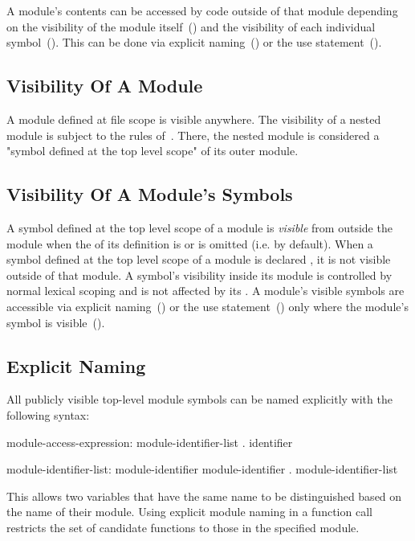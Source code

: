 A module's contents can be accessed by code outside of that module
depending on the visibility of the module
itself~() and the visibility of each
individual symbol~().  This can be done
via explicit naming~() or the use
statement~().

\subsection{Visibility Of A Module}
\label{Visibility_Of_A_Module}

A module defined at file scope is visible anywhere. The visibility of a nested
module is subject to the rules of~. There,
the nested module is considered a "symbol defined at the top level
scope" of its outer module.

\subsection{Visibility Of A Module's Symbols}
\label{Visibility_Of_Symbols}

A symbol defined at the top level scope of a module is \emph{visible}
from outside the module when the  of its
definition is  or is omitted (i.e. by default). When a
symbol defined at the top level scope of a module is declared
, it is not visible outside of that module. A
symbol's visibility inside its module is controlled by normal lexical
scoping and is not affected by its .  A
module's visible symbols are accessible via explicit
naming~() or the use
statement~() only where the module's symbol is
visible~().

\subsection{Explicit Naming}
\label{Explicit_Naming}

All publicly visible top-level module symbols can be named explicitly
with the following syntax:
\begin{syntax}
module-access-expression:
  module-identifier-list . identifier

module-identifier-list:
  module-identifier
  module-identifier . module-identifier-list

\end{syntax}
This allows two variables that have the same name to be distinguished
based on the name of their module.  Using explicit module naming in a
function call restricts the set of candidate functions to those in the
specified module.

